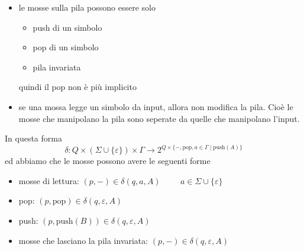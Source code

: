 \documentclass[12pt]{report}
\theoremstyle{definition}
\theoremstyle{regard}
\begin{document}
\begin{itemize}
\begin{center}
		\end{center}
 	\item le mosse sulla pila possono essere solo
 		\begin{itemize}
 			\item push di un simbolo
 			\item pop di un simbolo
		 	\item pila invariata
 		\end{itemize}
 		quindi il pop non è più implicito
 	\item se una mossa legge un simbolo da input, allora non modifica la pila. 
 		Cioè le mosse che manipolano la pila sono seperate da quelle che manipolano l'input.
\end{itemize}
In questa forma
$$ \delta : Q \times (\Sigma \cup \{\varepsilon\}) \times \Gamma \rightarrow 2^{Q \times \{-, \text{pop}, a \in \Gamma \mid \text{push}(A)\}} $$
ed abbiamo che le mosse possono avere le seguenti forme
\begin{itemize}
 	\item mosse di lettura: $ (p, -) \in \delta(q, a, A) \hspace{1cm} a \in \Sigma \cup \{\varepsilon\} $
 	\item pop: $(p, \text{pop}) \in \delta(q, \varepsilon , A) $
 	\item push: $(p, \text{push}(B)) \in \delta(q, \varepsilon , A) $
 	\item mosse che lasciano la pila invariata: $(p, -) \in \delta(q, \varepsilon , A) $
\end{itemize}
 
\end{document}

